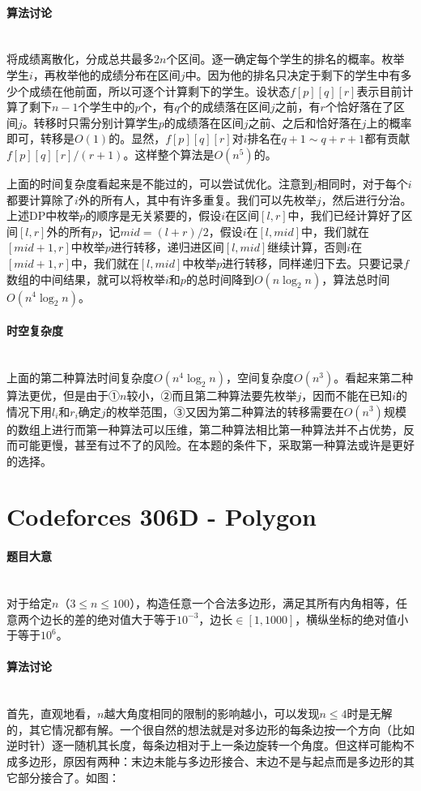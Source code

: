 \documentclass[UTF8]{ctexart}
\newcommand{\myparagraph}[1]{\paragraph{#1}\mbox{}\\}
\theoremstyle{nonumberplain}
\begin{document}
		\myparagraph{算法讨论}
		
			将成绩离散化，分成总共最多$2n$个区间。逐一确定每个学生的排名的概率。枚举学生$i$，再枚举他的成绩分布在区间$j$中。因为他的排名只决定于剩下的学生中有多少个成绩在他前面，所以可逐个计算剩下的学生。设状态$f[p][q][r]$表示目前计算了剩下$n-1$个学生中的$p$个，有$q$个的成绩落在区间$j$之前，有$r$个恰好落在了区间$j$。转移时只需分别计算学生$p$的成绩落在区间$j$之前、之后和恰好落在$j$上的概率即可，转移是$O(1)$的。显然，$f[p][q][r]$对$i$排名在$q+1 \sim q+r+1$都有贡献$f[p][q][r]/(r+1)$。这样整个算法是$O(n^5)$的。
			
			上面的时间复杂度看起来是不能过的，可以尝试优化。注意到$j$相同时，对于每个$i$都要计算除了$i$外的所有人，其中有许多重复。我们可以先枚举$j$，然后进行分治。上述DP中枚举$p$的顺序是无关紧要的，假设$i$在区间$[l,r]$中，我们已经计算好了区间$[l,r]$外的所有$p$，记$mid=(l+r)/2$，假设$i$在$[l,mid]$中，我们就在$[mid+1,r]$中枚举$p$进行转移，递归进区间$[l,mid]$继续计算，否则$i$在$[mid+1,r]$中，我们就在$[l,mid]$中枚举$p$进行转移，同样递归下去。只要记录$f$数组的中间结果，就可以将枚举$i$和$p$的总时间降到$O(n\log_2n)$，算法总时间$O(n^4\log_2n)$。
		
		\myparagraph{时空复杂度}
		
			上面的第二种算法时间复杂度$O(n^4\log_2n)$，空间复杂度$O(n^3)$。看起来第二种算法更优，但是由于①$n$较小，②而且第二种算法要先枚举$j$，因而不能在已知$i$的情况下用$l_i$和$r_i$确定$j$的枚举范围，③又因为第二种算法的转移需要在$O(n^3)$规模的数组上进行而第一种算法可以压维，第二种算法相比第一种算法并不占优势，反而可能更慢，甚至有过不了的风险。在本题的条件下，采取第一种算法或许是更好的选择。
	
	\section{Codeforces 306D - Polygon}
	
		\myparagraph{题目大意}
		
			对于给定$n$（$3 \leq n \leq 100$），构造任意一个合法多边形，满足其所有内角相等，任意两个边长的差的绝对值大于等于$10^{-3}$，边长$\in [1,1000]$，横纵坐标的绝对值小于等于$10^6$。
		
		\myparagraph{算法讨论}
		
			首先，直观地看，$n$越大角度相同的限制的影响越小，可以发现$n \leq 4$时是无解的，其它情况都有解。一个很自然的想法就是对多边形的每条边按一个方向（比如逆时针）逐一随机其长度，每条边相对于上一条边旋转一个角度。但这样可能构不成多边形，原因有两种：末边未能与多边形接合、末边不是与起点而是多边形的其它部分接合了。如图：
			
\end{document}
